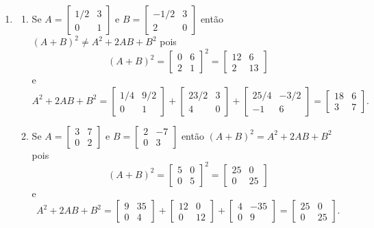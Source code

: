 \documentclass[12pt,a4paper]{article}
\begin{document}
\begin{enumerate}
\item 
\begin{enumerate}
\item Se $A =
\begin{bmatrix}
1/2 & 3 \\
0 & 1
\end{bmatrix}$
e
$B =
\begin{bmatrix}
-1/2 & 3 \\
2 & 0
\end{bmatrix}$
então $(A + B)^2 \neq A^2 + 2AB + B^2$ pois
\[
(A+B)^2 =
\begin{bmatrix}
0 & 6 \\
2 & 1
\end{bmatrix}^2
=
\begin{bmatrix}
12 & 6 \\
2 & 13
\end{bmatrix}
\]
e
\[
A^2 + 2AB + B^2 =
\begin{bmatrix}
1/4 & 9/2 \\
0 & 1
\end{bmatrix}
+
\begin{bmatrix}
23/2 & 3 \\
4 & 0
\end{bmatrix}
+
\begin{bmatrix}
25/4 & -3/2 \\
-1 & 6
\end{bmatrix}
=
\begin{bmatrix}
18 & 6 \\
3 & 7
\end{bmatrix}.
\]

\item Se $A =
\begin{bmatrix}
3 & 7 \\
0 & 2
\end{bmatrix}$
e
$B =
\begin{bmatrix}
2 & -7 \\
0 & 3
\end{bmatrix}$
então $(A + B)^2 = A^2 + 2AB + B^2$ pois
\[
(A+B)^2 =
\begin{bmatrix}
5 & 0 \\
0 & 5
\end{bmatrix}^2
=
\begin{bmatrix}
25 & 0 \\
0 & 25
\end{bmatrix}
\]
e
\[
A^2 + 2AB + B^2 =
\begin{bmatrix}
9 & 35 \\
0 & 4
\end{bmatrix}
+
\begin{bmatrix}
12 & 0 \\
0 & 12
\end{bmatrix}
+
\begin{bmatrix}
4 & -35 \\
0 & 9
\end{bmatrix}
=
\begin{bmatrix}
25 & 0 \\
0 & 25
\end{bmatrix}.
\]


\end{enumerate}
\end{enumerate}
\end{document}
